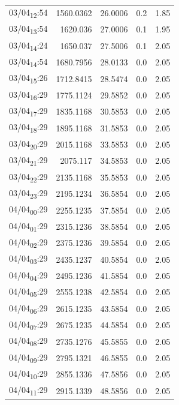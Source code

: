 \documentclass[11pt]{article}
\begin{document}
\begin{center}
\begin{tabular}{lrrrr}
03/04\textsubscript{12}:54 & 1560.0362 & 26.0006 & 0.2 & 1.85\\[0pt]
03/04\textsubscript{13}:54 & 1620.036 & 27.0006 & 0.1 & 1.95\\[0pt]
03/04\textsubscript{14}:24 & 1650.037 & 27.5006 & 0.1 & 2.05\\[0pt]
03/04\textsubscript{14}:54 & 1680.7956 & 28.0133 & 0.0 & 2.05\\[0pt]
03/04\textsubscript{15}:26 & 1712.8415 & 28.5474 & 0.0 & 2.05\\[0pt]
03/04\textsubscript{16}:29 & 1775.1124 & 29.5852 & 0.0 & 2.05\\[0pt]
03/04\textsubscript{17}:29 & 1835.1168 & 30.5853 & 0.0 & 2.05\\[0pt]
03/04\textsubscript{18}:29 & 1895.1168 & 31.5853 & 0.0 & 2.05\\[0pt]
03/04\textsubscript{20}:29 & 2015.1168 & 33.5853 & 0.0 & 2.05\\[0pt]
03/04\textsubscript{21}:29 & 2075.117 & 34.5853 & 0.0 & 2.05\\[0pt]
03/04\textsubscript{22}:29 & 2135.1168 & 35.5853 & 0.0 & 2.05\\[0pt]
03/04\textsubscript{23}:29 & 2195.1234 & 36.5854 & 0.0 & 2.05\\[0pt]
04/04\textsubscript{00}:29 & 2255.1235 & 37.5854 & 0.0 & 2.05\\[0pt]
04/04\textsubscript{01}:29 & 2315.1236 & 38.5854 & 0.0 & 2.05\\[0pt]
04/04\textsubscript{02}:29 & 2375.1236 & 39.5854 & 0.0 & 2.05\\[0pt]
04/04\textsubscript{03}:29 & 2435.1237 & 40.5854 & 0.0 & 2.05\\[0pt]
04/04\textsubscript{04}:29 & 2495.1236 & 41.5854 & 0.0 & 2.05\\[0pt]
04/04\textsubscript{05}:29 & 2555.1238 & 42.5854 & 0.0 & 2.05\\[0pt]
04/04\textsubscript{06}:29 & 2615.1235 & 43.5854 & 0.0 & 2.05\\[0pt]
04/04\textsubscript{07}:29 & 2675.1235 & 44.5854 & 0.0 & 2.05\\[0pt]
04/04\textsubscript{08}:29 & 2735.1276 & 45.5855 & 0.0 & 2.05\\[0pt]
04/04\textsubscript{09}:29 & 2795.1321 & 46.5855 & 0.0 & 2.05\\[0pt]
04/04\textsubscript{10}:29 & 2855.1336 & 47.5856 & 0.0 & 2.05\\[0pt]
04/04\textsubscript{11}:29 & 2915.1339 & 48.5856 & 0.0 & 2.05\\[0pt]

\end{tabular}
\end{center}
\end{document}
